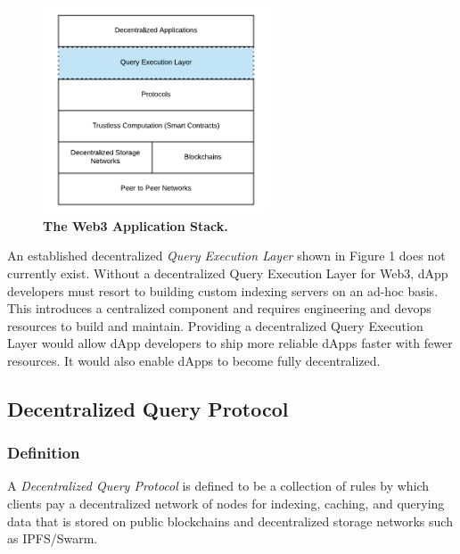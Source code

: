 \documentclass[12pt]{article}
\begin{document}
\setcounter{figure}{0}
\begin{figure}[H]
\caption
{\textbf{The Web3 Application Stack.}}
\begin{center}
\includegraphics[width=0.6\textwidth]{media/image8.png}
\end{center}
\end{figure}
\noindent
An established decentralized \textit{Query Execution Layer} shown in Figure 1 does not currently exist. Without a decentralized Query Execution Layer for Web3, dApp developers must resort to building custom indexing servers on an ad-hoc basis. This introduces a centralized component and requires engineering and devops resources to build and maintain. Providing a decentralized Query Execution Layer would allow dApp developers to ship more reliable dApps faster with fewer resources. It would also enable dApps to become fully decentralized.
\subsection{Decentralized Query Protocol}
\subsubsection*{Definition}
A \textit{Decentralized Query Protocol} is defined to be a collection of rules by which clients pay a decentralized network of nodes for indexing, caching, and querying data that is stored on public blockchains and decentralized storage networks such as IPFS/Swarm.
\end{document}
